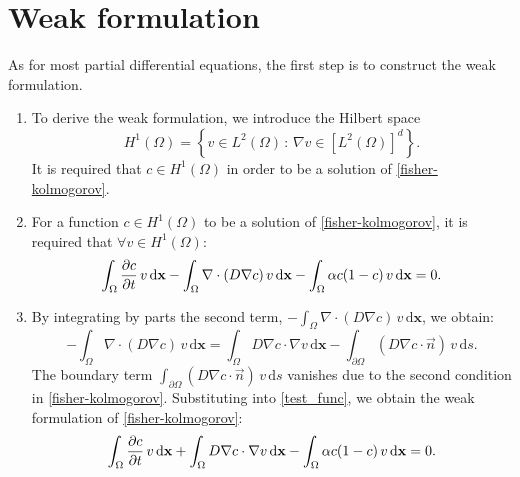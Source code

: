 \documentclass[12pt, a4paper, twoside, openright]{report}
\begin{document}
\section{Weak formulation}
As for most partial differential equations, the first step is to construct the weak formulation.
\begin{enumerate}
  \item To derive the weak formulation, we introduce the Hilbert space
        \[
          H^1(\Omega) = \left\{ v \in L^2(\Omega) \, : \, \nabla v \in \left[L^2(\Omega)\right]^d \right\}.
        \]
        It is required that $c \in H^1(\Omega)$ in order to be a solution of \autoref{fisher-kolmogorov}.

  \item For a function $c \in H^1(\Omega)$ to be a solution of \autoref{fisher-kolmogorov}, it is required that $\forall v \in H^1(\Omega)$:
        \begin{equation}
          \label{test_func}
          \int_{\Omega} \pdv{c}{t} \, v \, \mathrm{d}\mathbf{x}
          - \int_{\Omega} \nabla \cdot (D \nabla c) \, v \, \mathrm{d}\mathbf{x}
          - \int_{\Omega} \alpha c(1-c) \, v \, \mathrm{d}\mathbf{x} = 0.
        \end{equation}

  \item By integrating by parts the second term, $-\int_{\Omega} \nabla \cdot (D \nabla c) \, v \, \mathrm{d}\mathbf{x}$, we obtain:
        \begin{equation}
          \label{integrate_by_parts}
          - \int_{\Omega} \nabla \cdot (D \nabla c) \, v \, \mathrm{d}\mathbf{x}
          = \int_{\Omega} D \nabla c \cdot \nabla v \, \mathrm{d}\mathbf{x}
          - \int_{\partial \Omega} (D \nabla c \cdot \vec{n}) \, v \, \mathrm{d}s.
        \end{equation}
        The boundary term $\int_{\partial \Omega} (D \nabla c \cdot \vec{n}) \, v \, \mathrm{d}s$ vanishes due to the second condition in \autoref{fisher-kolmogorov}. Substituting into \autoref{test_func}, we obtain the weak formulation of \autoref{fisher-kolmogorov}:
        \begin{equation}
          \label{weak_formulation}
          \int_{\Omega} \pdv{c}{t} \, v \, \mathrm{d}\mathbf{x}
          + \int_{\Omega} D \nabla c \cdot \nabla v \, \mathrm{d}\mathbf{x}
          - \int_{\Omega} \alpha c(1-c) \, v \, \mathrm{d}\mathbf{x} = 0.
        \end{equation}
\end{enumerate}
\end{document}
